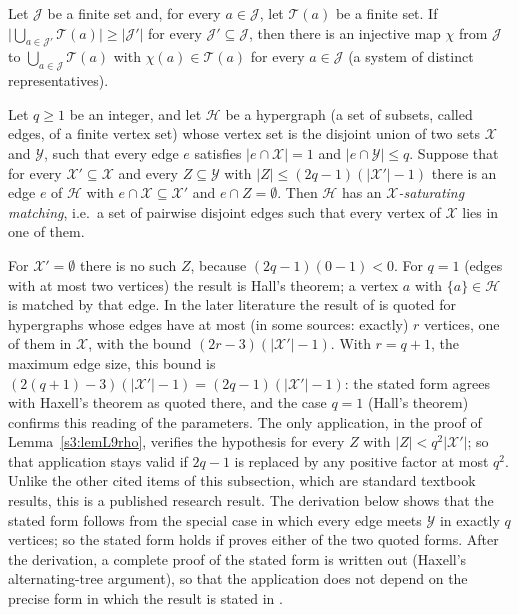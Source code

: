 \begin{citedresult}\label{s1:citHall}
Let $\mathcal J$ be a finite set and, for every $a\in\mathcal J$, let
$\mathcal T(a)$ be a finite set. If
$\bigl|\bigcup_{a\in\mathcal J'}\mathcal T(a)\bigr|\ge|\mathcal J'|$ for every
$\mathcal J'\subseteq\mathcal J$, then there is an injective map $\chi$ from
$\mathcal J$ to $\bigcup_{a\in\mathcal J}\mathcal T(a)$ with
$\chi(a)\in\mathcal T(a)$ for every $a\in\mathcal J$ (a system of distinct
representatives).
\end{citedresult}

\begin{citedresult}\label{s1:citHaxell}
Let $q\ge1$ be an integer, and let $\mathcal H$ be a hypergraph (a set of
subsets, called edges, of a finite vertex set) whose vertex set is the
disjoint union of two sets $\mathcal X$ and $\mathcal Y$, such that every edge
$e$ satisfies $|e\cap\mathcal X|=1$ and $|e\cap\mathcal Y|\le q$. Suppose that
for every $\mathcal X'\subseteq\mathcal X$ and every $Z\subseteq\mathcal Y$ with
$|Z|\le(2q-1)(|\mathcal X'|-1)$ there is an edge $e$ of $\mathcal H$ with
$e\cap\mathcal X\subseteq\mathcal X'$ and $e\cap Z=\emptyset$. Then
$\mathcal H$ has an \emph{$\mathcal X$-saturating matching}, i.e.\ a set of
pairwise disjoint edges such that every vertex of $\mathcal X$ lies in one of
them.

For $\mathcal X'=\emptyset$ there is no such $Z$, because $(2q-1)(0-1)<0$. For
$q=1$ (edges with at most two vertices) the result is Hall's theorem; a vertex
$a$ with $\{a\}\in\mathcal H$ is matched by that edge. In the later literature
the result of \cite{Hax95} is quoted for hypergraphs whose edges have at most
(in some sources: exactly) $r$ vertices, one of them in $\mathcal X$, with the
bound $(2r-3)(|\mathcal X'|-1)$. With $r=q+1$, the maximum edge size, this bound
is $(2(q+1)-3)(|\mathcal X'|-1)=(2q-1)(|\mathcal X'|-1)$: the stated form agrees
with Haxell's theorem as quoted there, and the case $q=1$ (Hall's theorem)
confirms this reading of the parameters. The only application, in the proof of
Lemma~\ref{s3:lemL9rho}, verifies the hypothesis for every $Z$ with
$|Z|<q^2|\mathcal X'|$; so that application stays valid if $2q-1$ is replaced
by any positive factor at most $q^2$. Unlike the other cited items of this
subsection, which are standard textbook results, this is a published research
result. The derivation below shows
that the stated form follows from the special case in which every edge meets
$\mathcal Y$ in exactly $q$ vertices; so the stated form holds if \cite{Hax95}
proves either of the two quoted forms. After the derivation, a complete proof of
the stated form is written out (Haxell's alternating-tree argument), so that
the application does not depend on the precise form in which the result is
stated in \cite{Hax95}.
\end{citedresult}
